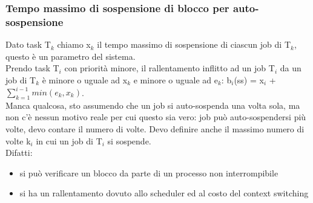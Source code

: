 \documentclass[18px]{article}
\begin{document}
\subsubsection{Tempo massimo di sospensione di blocco per auto-sospensione}
Dato task T$_{k}$ chiamo x$_{k}$ il tempo massimo di sospensione di ciascun job di T$_{k}$, questo è un parametro del sistema.\\ Prendo task T$_{i}$ con priorità minore, il rallentamento inflitto ad un job T$_{i}$ da un job di T$_{k}$ è minore o uguale ad x$_{k}$ e minore o uguale ad e$_{k}$:
b$_{i}$(ss) = x$_{i}$ + $\sum\limits_{k = 1}^{i-1}min(e_{k}, x_{k})$.\\ Manca qualcosa, sto assumendo che un job si auto-sospenda una volta sola, ma non c'è nessun motivo reale per cui questo sia vero: job può auto-sospendersi più volte, devo contare il numero di volte. Devo definire anche il massimo numero di volte k$_{i}$ in cui un job di T$_{i}$ si sospende.\\ Difatti:
\begin{itemize}
\item si può verificare un blocco da parte di un processo non interrompibile
\item si ha un rallentamento dovuto allo scheduler ed al costo del context switching
\end{itemize}
\end{document}
